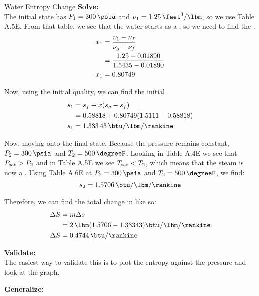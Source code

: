\begin{example}{Water Entropy Change}
  \textbf{Solve:} \\
  The initial state has $\Pressure_{1} = \SI{300}{\psia}$ and $\SpecificVolume_{1} = \SI{1.25}{\feet\cubed\per\lbm}$, so we use Table A.5E.
  From that table, we see that the water starts as a , so we need to find the .
  \begin{align*}
    x_{1} &= \frac{\nu_{1} - \nu_{f}}{\nu_{g} - \nu_{f}} \\
             &= \frac{1.25 - 0.01890}{1.5435 - 0.01890} \\
    x_{1} &= 0.80749
  \end{align*}

  Now, using the initial quality, we can find the initial .
  \begin{align*}
    \SpecificEntropy_{1} &= \Fluid{\SpecificEntropy} + \Quality (\Vapor{\SpecificEntropy} - \Fluid{\SpecificEntropy}) \\
                     &= 0.58818 + 0.80749 (1.5111 - 0.58818) \\
    \SpecificEntropy_{1} &= \SI{1.33343}{\btu\per\lbm\per\rankine}
  \end{align*}

  Now, moving onto the final state.
  Because the pressure remains constant, $\Pressure_{2} = \SI{300}{\psia}$ and $\Temp_{2} = \SI{500}{\degreeF}$.
  Looking in Table A.4E we see that $P_{\mathrm{sat}} > P_{2}$ and in Table A.5E we see $T_{\mathrm{sat}} < T_{2}$, which means that the steam is now a .
  Using Table A.6E at $\Pressure_{2} = \SI{300}{\psia}$ and $\Temp_{2} = \SI{500}{\degreeF}$, we find:
  \begin{equation*}
    \SpecificEntropy_{2} = \SI{1.5706}{\btu\per\lbm\per\rankine}
  \end{equation*}

  Therefore, we can find the total change in  like so:
  \begin{align*}
    \Change{\Entropy} &= \Mass \Change{\SpecificEntropy} \\
                      &= \SI{2}{\lbm} (1.5706 - 1.33343) \si{\btu\per\lbm\per\rankine} \\
    \Change{\Entropy} &= \SI{0.4744}{\btu\per\rankine}
  \end{align*}

  \textbf{Validate:} \\
  The easiest way to validate this is to plot the entropy against the pressure and look at the graph.

  \textbf{Generalize:} \\

\end{example}

